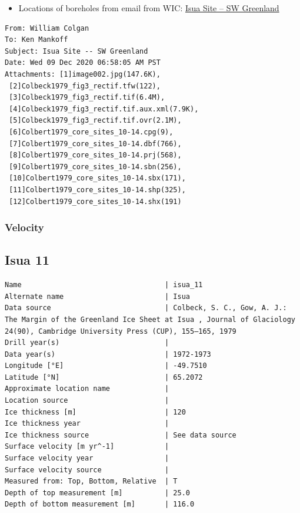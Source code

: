 \documentclass[article,a4paper,times,11pt,twoside]{article}
\begin{document}
\begin{itemize}
\item Locations of boreholes from email from WIC: \href{msgid:AM0PR04MB6129F131ECD9123E72752945A2CC0@AM0PR04MB6129.eurprd04.prod.outlook.com}{Isua Site -- SW Greenland}
\end{itemize}

\begin{verbatim}
From: William Colgan
To: Ken Mankoff
Subject: Isua Site -- SW Greenland
Date: Wed 09 Dec 2020 06:58:05 AM PST
Attachments: [1]image002.jpg(147.6K),
 [2]Colbeck1979_fig3_rectif.tfw(122),
 [3]Colbeck1979_fig3_rectif.tif(6.4M),
 [4]Colbeck1979_fig3_rectif.tif.aux.xml(7.9K),
 [5]Colbeck1979_fig3_rectif.tif.ovr(2.1M),
 [6]Colbert1979_core_sites_10-14.cpg(9),
 [7]Colbert1979_core_sites_10-14.dbf(766),
 [8]Colbert1979_core_sites_10-14.prj(568),
 [9]Colbert1979_core_sites_10-14.sbn(256),
 [10]Colbert1979_core_sites_10-14.sbx(171),
 [11]Colbert1979_core_sites_10-14.shp(325),
 [12]Colbert1979_core_sites_10-14.shx(191)
\end{verbatim}

\subsubsection{Velocity}
\label{sec:org6ac5175}
\clearpage
\subsection{Isua 11}
\label{sec:org84301d1}
\begin{verbatim}
Name                                  | isua_11
Alternate name                        | Isua
Data source                           | Colbeck, S. C., Gow, A. J.: The Margin of the Greenland Ice Sheet at Isua , Journal of Glaciology 24(90), Cambridge University Press (CUP), 155–165, 1979 
Drill year(s)                         | 
Data year(s)                          | 1972-1973
Longitude [°E]                        | -49.7510
Latitude [°N]                         | 65.2072
Approximate location name             | 
Location source                       | 
Ice thickness [m]                     | 120
Ice thickness year                    | 
Ice thickness source                  | See data source
Surface velocity [m yr^-1]            | 
Surface velocity year                 | 
Surface velocity source               | 
Measured from: Top, Bottom, Relative  | T
Depth of top measurement [m]          | 25.0
Depth of bottom measurement [m]       | 116.0
\end{verbatim}
\end{document}
